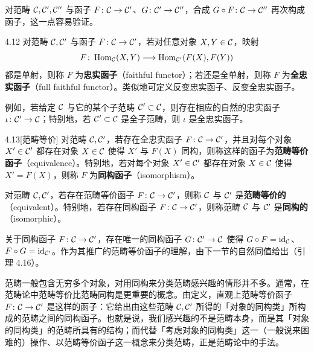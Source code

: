 对范畴 $\mathcal{C},\mathcal{C}',\mathcal{C}''$ 与函子 $F\colon\mathcal{C}\to\mathcal{C}'$、$G\colon\mathcal{C}'\to\mathcal{C}''$，合成 $G\circ F\colon\mathcal{C}\to\mathcal{C}''$ 再次构成函子，这一点容易验证。

\begin{definition}{4.12}
对范畴 $\mathcal{C},\mathcal{C}'$ 与函子 $F\colon\mathcal{C}\to\mathcal{C}'$，若对任意对象 $X,Y\in\mathcal{C}$，映射
\[ F\colon\operatorname{Hom}_{\mathcal{C}}(X,Y)\longrightarrow\operatorname{Hom}_{\mathcal{C}'}(F(X),F(Y)) \]
都是单射，则称 $F$ 为\textbf{忠实函子}（faithful functor）；若还是全单射，则称 $F$ 为\textbf{全忠实函子}（full faithful functor）。类似地可定义反变忠实函子、反变全忠实函子。
\end{definition}

例如，若给定 $\mathcal{C}$ 与它的某个子范畴 $\mathcal{C}'\subset\mathcal{C}$，则存在相应的自然的忠实函子 $\iota\colon\mathcal{C}'\to\mathcal{C}$；特别地，若 $\mathcal{C}'\subset\mathcal{C}$ 是全子范畴，则 $\iota$ 是全忠实函子。

\begin{definition}{4.13}[范畴等价]
对范畴 $\mathcal{C},\mathcal{C}'$，若存在全忠实函子 $F\colon\mathcal{C}\to\mathcal{C}'$，并且对每个对象 $X'\in\mathcal{C}'$ 都存在对象 $X\in\mathcal{C}$ 使得 $X'$ 与 $F(X)$ 同构，则称这样的函子为\textbf{范畴等价函子}（equivalence）。特别地，若对每个对象 $X'\in\mathcal{C}'$ 都存在对象 $X\in\mathcal{C}$ 使得 $X'=F(X)$，则称 $F$ 为\textbf{同构函子}（isomorphism）。
\end{definition}

对范畴 $\mathcal{C},\mathcal{C}'$，若存在范畴等价函子 $F\colon\mathcal{C}\to\mathcal{C}'$，则称 $\mathcal{C}$ 与 $\mathcal{C}'$ 是\textbf{范畴等价的}（equivalent）。特别地，若存在同构函子 $F\colon\mathcal{C}\to\mathcal{C}'$，则称范畴 $\mathcal{C}$ 与 $\mathcal{C}'$ 是\textbf{同构的}（isomorphic）。

关于同构函子 $F\colon\mathcal{C}\to\mathcal{C}'$，存在唯一的同构函子 $G\colon\mathcal{C}'\to\mathcal{C}$ 使得 $G\circ F=\mathrm{id}_{\mathcal{C}}$、$F\circ G=\mathrm{id}_{\mathcal{C}'}$。作为其推广的范畴等价函子的理解，由下一节的自然同值给出（引理 4.16）。

范畴一般包含无穷多个对象，对用同构来分类范畴感兴趣的情形并不多。通常，在范畴论中范畴等价比范畴同构是更重要的概念。由定义，直观上范畴等价函子 $F\colon\mathcal{C}\to\mathcal{C}'$ 是这样的函子：它给出由这些范畴 $\mathcal{C},\mathcal{C}'$ 所得的「对象的同构类」所构成的范畴之间的同构函子。也就是说，我们感兴趣的不是范畴本身，而是其「对象的同构类」的范畴所具有的结构；而代替「考虑对象的同构类」这一（一般说来困难的）操作、以范畴等价函子这一概念来分类范畴，正是范畴论中的手法。
